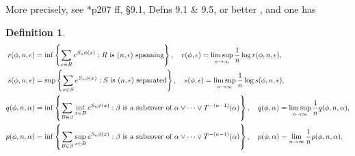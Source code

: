 \documentclass[a4paper]{amsart}
\theoremstyle{plain}
\theoremstyle{definition}
\newtheorem{definition}[theorem]{Definition}%
\theoremstyle{remark}
\begin{document}
 \medskip More precisely, see \cite{Wal}*{p207 ff, \S 9.1, Defns 9.1 \& 9.5},  or better \cite{Walvp}, and one has 
\begin{definition}
\begin{align*}
r(\phi, n , \epsilon ) &= \inf \left\{\sum_{x\in R} e^{S_n\phi(x)} : R \text{ is  $ (n, \epsilon) $ spanning} \right\},
  \quad r(\phi, \epsilon) = \limsup_{n\to \infty} \frac{1}{n}\log r(\phi, n , \epsilon )  , \\
s(\phi, n , \epsilon ) &= \sup \left\{\sum_{x\in S} e^{S_n\phi(x)} : S \text{ is  $ (n, \epsilon) $ separated} \right\} ,
\quad  s(\phi, \epsilon) = \limsup_{n\to \infty} \frac{1}{n}\log s(\phi, n , \epsilon ) , \\
q(\phi, n, \alpha )          &= \inf \left\{ \sum_{B \in \beta } \inf_{x\in B} e^{S_n\phi(x)} : \beta \text{ is a subcover of  } \alpha \vee \dots \vee T^{-(n-1)}(\alpha)\right\},
\quad q(\phi,  \alpha )  = \limsup_{n\to \infty} \frac{1}{n} q(\phi, n, \alpha ) ,\\
p(\phi, n, \alpha )         & = \inf \left\{ \sum_{B \in \beta }\sup_{x\in B} e^{S_n\phi(x)} : \beta \text{ is a subcover of  } \alpha \vee \dots \vee T^{-(n-1)}(\alpha)\right\},
\quad p(\phi,  \alpha )  = \lim_{n\to \infty} \frac{1}{n} p(\phi, n, \alpha ) .
\end{align*} 
\end{definition}  
\end{document}

